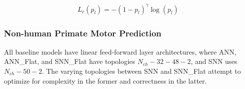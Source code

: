 \begin{equation}
\begin{aligned}
L_c\left(p_{{l}}\right)=-\left(1-p_{{l}}\right)^{\gamma} \log \left(p_{{l}}\right)
\end{aligned} \label{eq:objdet_classification_loss}
\end{equation}




\subsubsection*{Non-human Primate Motor Prediction}








All baseline models have linear feed-forward layer architectures, where ANN, ANN\_Flat, and SNN\_Flat have topologies $N_{ch}-32-48-2$, and SNN uses $N_{ch}-50-2$. The varying topologies between SNN and SNN\_Flat attempt to optimize for complexity in the former and correctness in the latter.

